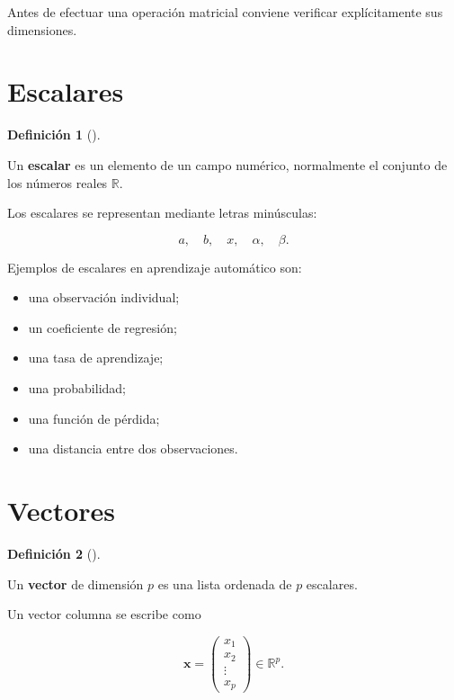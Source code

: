 \documentclass[
  spanish,
  10.5pt,
  letterpaper,
  DIV=11,
  numbers=noendperiod,
  oneside,
  open=any]{scrreprt}
\providecommand{\tightlist}{%
  \setlength{\itemsep}{0pt}\setlength{\parskip}{0pt}}
\theoremstyle{definition}
\newtheorem{definition}{Definición}[chapter]
\theoremstyle{definition}
\theoremstyle{plain}
\theoremstyle{remark}
\begin{document}
Antes de efectuar una operación matricial conviene verificar
explícitamente sus dimensiones.

\section*{Escalares}\label{escalares}


\begin{definition}[]\protect\hypertarget{def-escalar}{}\label{def-escalar}

Un \textbf{escalar} es un elemento de un campo numérico, normalmente el
conjunto de los números reales \(\mathbb{R}\).

\end{definition}

Los escalares se representan mediante letras minúsculas:

\[
a,\quad b,\quad x,\quad \alpha,\quad \beta.
\]

Ejemplos de escalares en aprendizaje automático son:

\begin{itemize}
\tightlist
\item
  una observación individual;
\item
  un coeficiente de regresión;
\item
  una tasa de aprendizaje;
\item
  una probabilidad;
\item
  una función de pérdida;
\item
  una distancia entre dos observaciones.
\end{itemize}

\section*{Vectores}\label{vectores}


\begin{definition}[]\protect\hypertarget{def-vector}{}\label{def-vector}

Un \textbf{vector} de dimensión \(p\) es una lista ordenada de \(p\)
escalares.

\end{definition}

Un vector columna se escribe como

\[
\mathbf{x}
=
\begin{pmatrix}
x_1\\
x_2\\
\vdots\\
x_p
\end{pmatrix}
\in\mathbb{R}^{p}.
\]
\end{document}
